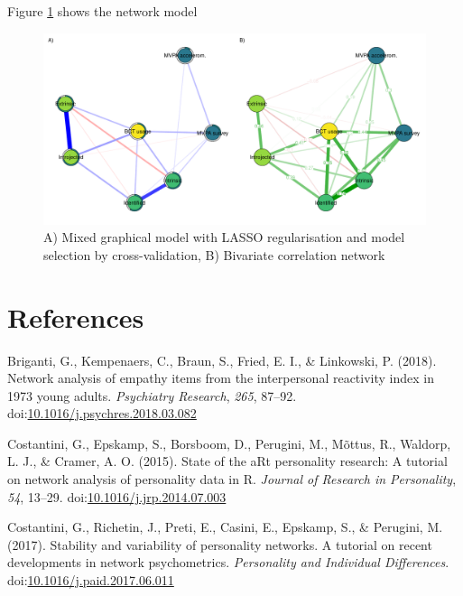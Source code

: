 \documentclass[english,floatsintext,]{apa6}
\theoremstyle{definition}
\theoremstyle{definition}
\theoremstyle{definition}
\theoremstyle{remark}
\begin{document}
Figure \ref{fig:network-plot} shows the network model

\begin{figure}
\centering
\includegraphics{_baseline-manuscript_files/figure-latex/network-plot-1.pdf}
\caption{\label{fig:network-plot}A) Mixed graphical model with LASSO
regularisation and model selection by cross-validation, B) Bivariate
correlation network}
\end{figure}

\newpage

\section{References}\label{references}

\begingroup
\setlength{\parindent}{-0.5in} \setlength{\leftskip}{0.5in}

\hypertarget{refs}{}
\hypertarget{ref-brigantiNetworkAnalysisEmpathy2018}{}
Briganti, G., Kempenaers, C., Braun, S., Fried, E. I., \& Linkowski, P.
(2018). Network analysis of empathy items from the interpersonal
reactivity index in 1973 young adults. \emph{Psychiatry Research},
\emph{265}, 87--92.
doi:\href{https://doi.org/10.1016/j.psychres.2018.03.082}{10.1016/j.psychres.2018.03.082}

\hypertarget{ref-costantiniStateARtPersonality2015}{}
Costantini, G., Epskamp, S., Borsboom, D., Perugini, M., Mõttus, R.,
Waldorp, L. J., \& Cramer, A. O. (2015). State of the aRt personality
research: A tutorial on network analysis of personality data in R.
\emph{Journal of Research in Personality}, \emph{54}, 13--29.
doi:\href{https://doi.org/10.1016/j.jrp.2014.07.003}{10.1016/j.jrp.2014.07.003}

\hypertarget{ref-costantiniStabilityVariabilityPersonality2017}{}
Costantini, G., Richetin, J., Preti, E., Casini, E., Epskamp, S., \&
Perugini, M. (2017). Stability and variability of personality networks.
A tutorial on recent developments in network psychometrics.
\emph{Personality and Individual Differences}.
doi:\href{https://doi.org/10.1016/j.paid.2017.06.011}{10.1016/j.paid.2017.06.011}
\end{document}
